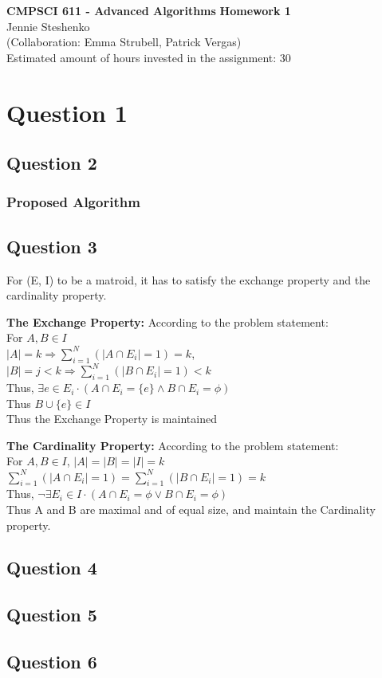 \documentclass{article}
\begin{document}
\begin{center} \LARGE\textbf{CMPSCI 611 - Advanced Algorithms}
\Large\textbf{Homework 1}
\vspace{0.5cm}\\Jennie Steshenko\\
\small{(Collaboration: Emma Strubell, Patrick Vergas)}\\
Estimated amount of hours invested in the assignment: 30
\end{center}

\section*{Question 1}


\subsection*{Question 2}
\subsubsection*{Proposed Algorithm}

\subsection*{Question 3}

For (E, I) to be a matroid, it has to satisfy the exchange property and the cardinality property.

\textbf{The Exchange Property:} According to the problem statement:\\
For $A, B \in I\:$\\
$\mid A \mid = k \Rightarrow \sum_{i=1}^N \left( \mid A \cap E_i \mid = 1 \right) = k$,\\ 
$\mid B \mid = j < k \Rightarrow \sum_{i=1}^N \left( \mid B \cap E_i \mid = 1 \right) < k $\\
Thus, $\exists e \in E_i \cdot \left(  A \cap E_i = \{ e \} \wedge B \cap E_i = \phi \right)$\\
Thus $B \cup \{e \} \in I$\\
Thus the Exchange Property is maintained

\textbf{The Cardinality Property:} According to the problem statement:\\
For $A, B \in I$, $\mid A \mid = \mid B \mid = \mid I \mid = k$\\
$\sum_{i=1}^N \left( \mid A \cap E_i \mid = 1 \right) = 
\sum_{i=1}^N \left( \mid B \cap E_i \mid = 1 \right)= k$\\
Thus, $\neg\exists E_i \in I \cdot \left( A \cap E_i = \phi \vee B \cap E_i = \phi \right)$\\
Thus A and B are maximal and of equal size, and maintain the Cardinality property.

\subsection*{Question 4}


\clearpage

\subsection*{Question 5}

\subsection*{Question 6}
\end{document}
